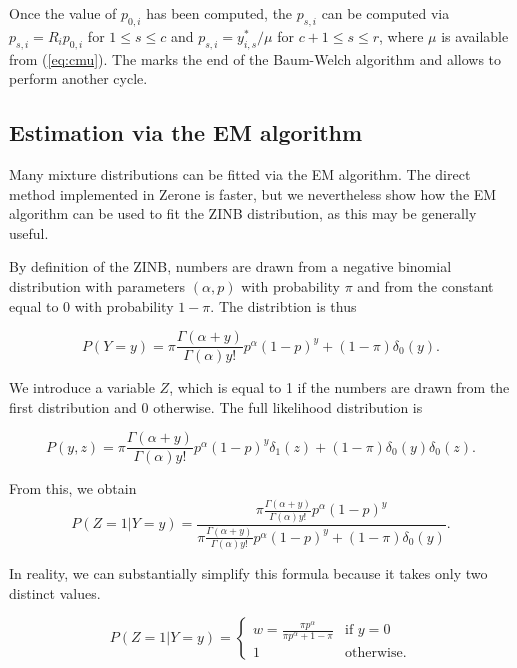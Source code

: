 \documentclass[12pt]{article}
\begin{document}
    Once the value of $p_{0,i}$ has been computed, the
    $p_{s,i}$ can be computed via $p_{s,i} = R_i p_{0,i}$ for
    $1 \leq s \leq c$ and $p_{s,i} = y_{i,s}^* / \mu$ for
    $c+1 \leq s \leq r$,
    where $\mu$ is available from (\ref{eq:cmu}). The marks
    the end of the Baum-Welch algorithm and allows to perform
    another cycle.

\newpage
\begin{appendices}
\section{Estimation via the EM algorithm}

    Many mixture distributions can be fitted via the EM algorithm.
    The direct method implemented in Zerone is faster, but we
    nevertheless show how the EM algorithm can be used to fit
    the ZINB distribution, as this may be generally useful.

    By definition of the ZINB, numbers are drawn from a negative
    binomial distribution with parameters $(\alpha, p)$ with probability
    $\pi$ and from the constant equal to 0 with probability
    $1-\pi$. The distribtion is thus

    \begin{equation*}
\label{ZINB}
    P(Y = y) = \pi \frac{\Gamma(\alpha+y)}{\Gamma(\alpha)y!}
    p^{\alpha}(1-p)^y + (1-\pi)\delta_0(y).
    \end{equation*}

    We introduce a variable $Z$, which is equal to 1 if the numbers
    are drawn from the first distribution and 0 otherwise. The full
    likelihood distribution is

    \begin{equation*}
    P(y,z) = \pi\frac{\Gamma(\alpha+y)}{\Gamma(\alpha)y!}
    p^{\alpha}(1-p)^y\delta_1(z) +
    (1-\pi)\delta_0(y)\delta_0(z).
    \end{equation*}

    From this, we obtain
    \begin{equation*}
    P(Z=1|Y=y) =\frac{\pi\frac{\Gamma(\alpha+y)}{\Gamma(\alpha)y!}
    p^{\alpha}(1-p)^y}{
    \pi\frac{\Gamma(\alpha+y)}{\Gamma(\alpha)y!}
    p^{\alpha}(1-p)^y + (1-\pi)\delta_0(y)}.
    \end{equation*}

    In reality, we can substantially simplify this formula because
    it takes only two distinct values.

    \begin{equation}
\label{w}
    P(Z=1|Y=y) = \left\{
      \begin{array}{ll}
        w = \frac{\pi p^{\alpha}}{\pi p^{\alpha}+1-\pi}
        & \mbox{if } y = 0\\
        1 & \mbox{otherwise.}
      \end{array}
    \right.
    \end{equation}


\end{appendices}
\end{document}
